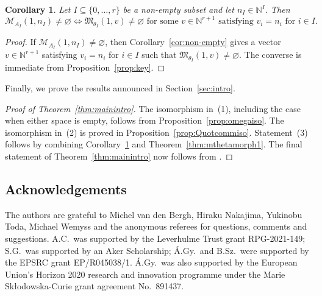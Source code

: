 \documentclass[10pt,a4paper]{amsart}
\newtheorem{Corollary}[Theorem]{Corollary}
\newcommand{\PiQ}{A}
\numberwithin{equation}{section}
\begin{document}
\begin{Corollary}
\label{cor:MfMnonempty}
Let $I\subseteq \{0,\ldots, r\}$ be a non-empty subset and let $n_I\in {\mathbb N}^I$. Then
\[
\mathcal{M}_{\PiQ_I} (1,n_I)\neq \varnothing \iff \mathfrak{M}_{\theta_I}(1,v)\neq \varnothing\text{ for some }v\in \mathbb{N}^{r+1}\text{ satisfying }v_i=n_i\text{ for }i\in I.
\]
\end{Corollary}
\begin{proof}
If $\mathcal{M}_{\PiQ_I} (1,n_I)\neq \varnothing$, then Corollary~\ref{cor:non-empty} gives a vector $v\in \mathbb{N}^{r+1}$ satisfying $v_i=n_i$ for $i\in I$ such that $\mathfrak{M}_{\theta_I}(1,v)\neq \varnothing$. The converse is immediate from Proposition~\ref{prop:key}.
\end{proof}

Finally, we prove the results announced in Section~\ref{sec:intro}.
\begin{proof}[Proof of Theorem~\ref{thm:mainintro}]
The isomorphism in~(1), including the case when either space is empty, follows from Proposition~\ref{prop:omegaiso}. The isomorphism in~(2) is proved in Proposition~\ref{prop:Quotcommiso}. Statement~(3) follows by combining Corollary~\ref{cor:MfMnonempty} and Theorem~\ref{thm:mthetamorph1}. The final statement of Theorem~\ref{thm:mainintro} now
follows from \cite[Theorem~1.5]{bellamy2016symplectic}.
\end{proof}


\subsection*{Acknowledgements} The authors are grateful to Michel van den Bergh, Hiraku Nakajima, Yukinobu Toda, Michael Wemyss and the anonymous referees for questions, comments and suggestions. A.C.\ was supported by the Leverhulme Trust grant RPG-2021-149; S.G.~was supported by an Aker Scholarship; \'A.Gy.~and B.Sz.~were supported by
the EPSRC grant EP/R045038/1. \'A.Gy.~was also supported by the European Union's Horizon 2020
research and innovation programme under the Marie Sk{\l}odowska-Curie grant
agreement No.\ 891437.

\end{document}
